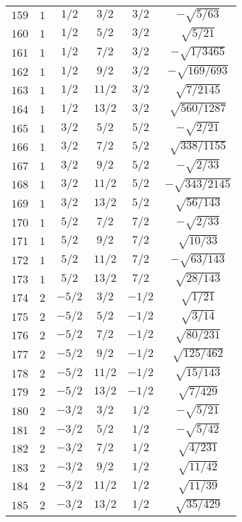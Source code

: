 \begin{table}
\begin{center}
\begin{tabular}{|c|c|c|c|c|c|}
$159$ & $1$ & $1/2$ & $3/2$ & $3/2$ & $-\sqrt{5/63}$ \\ 
$160$ & $1$ & $1/2$ & $5/2$ & $3/2$ & $\sqrt{5/21}$ \\ 
$161$ & $1$ & $1/2$ & $7/2$ & $3/2$ & $-\sqrt{1/3465}$ \\ 
$162$ & $1$ & $1/2$ & $9/2$ & $3/2$ & $-\sqrt{169/693}$ \\ 
$163$ & $1$ & $1/2$ & $11/2$ & $3/2$ & $\sqrt{7/2145}$ \\ 
$164$ & $1$ & $1/2$ & $13/2$ & $3/2$ & $\sqrt{560/1287}$ \\ 
$165$ & $1$ & $3/2$ & $5/2$ & $5/2$ & $-\sqrt{2/21}$ \\ 
$166$ & $1$ & $3/2$ & $7/2$ & $5/2$ & $\sqrt{338/1155}$ \\ 
$167$ & $1$ & $3/2$ & $9/2$ & $5/2$ & $-\sqrt{2/33}$ \\ 
$168$ & $1$ & $3/2$ & $11/2$ & $5/2$ & $-\sqrt{343/2145}$ \\ 
$169$ & $1$ & $3/2$ & $13/2$ & $5/2$ & $\sqrt{56/143}$ \\ 
$170$ & $1$ & $5/2$ & $7/2$ & $7/2$ & $-\sqrt{2/33}$ \\ 
$171$ & $1$ & $5/2$ & $9/2$ & $7/2$ & $\sqrt{10/33}$ \\ 
$172$ & $1$ & $5/2$ & $11/2$ & $7/2$ & $-\sqrt{63/143}$ \\ 
$173$ & $1$ & $5/2$ & $13/2$ & $7/2$ & $\sqrt{28/143}$ \\ 
$174$ & $2$ & $-5/2$ & $3/2$ & $-1/2$ & $\sqrt{1/21}$ \\ 
$175$ & $2$ & $-5/2$ & $5/2$ & $-1/2$ & $\sqrt{3/14}$ \\ 
$176$ & $2$ & $-5/2$ & $7/2$ & $-1/2$ & $\sqrt{80/231}$ \\ 
$177$ & $2$ & $-5/2$ & $9/2$ & $-1/2$ & $\sqrt{125/462}$ \\ 
$178$ & $2$ & $-5/2$ & $11/2$ & $-1/2$ & $\sqrt{15/143}$ \\ 
$179$ & $2$ & $-5/2$ & $13/2$ & $-1/2$ & $\sqrt{7/429}$ \\ 
$180$ & $2$ & $-3/2$ & $3/2$ & $1/2$ & $-\sqrt{5/21}$ \\ 
$181$ & $2$ & $-3/2$ & $5/2$ & $1/2$ & $-\sqrt{5/42}$ \\ 
$182$ & $2$ & $-3/2$ & $7/2$ & $1/2$ & $\sqrt{4/231}$ \\ 
$183$ & $2$ & $-3/2$ & $9/2$ & $1/2$ & $\sqrt{11/42}$ \\ 
$184$ & $2$ & $-3/2$ & $11/2$ & $1/2$ & $\sqrt{11/39}$ \\ 
$185$ & $2$ & $-3/2$ & $13/2$ & $1/2$ & $\sqrt{35/429}$ \\ 

\end{tabular}
\end{center}
\end{table}
